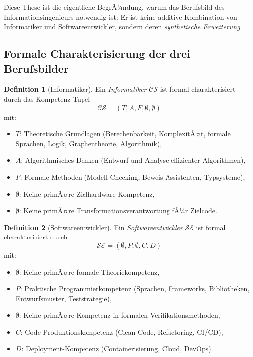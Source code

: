 ﻿\documentclass[a4paper,12pt]{article}
\theoremstyle{definition}
\newtheorem{definition}{Definition}
\begin{document}
Diese These ist die eigentliche BegrÃ¼ndung, warum das Berufsbild des
Informationsingenieurs notwendig ist: Er ist keine additive Kombination von
Informatiker und Softwareentwickler, sondern deren \emph{synthetische Erweiterung}.

\subsection{Formale Charakterisierung der drei Berufsbilder}

\begin{definition}[Informatiker]
\label{def:informatiker}
Ein \emph{Informatiker} $\mathcal{CS}$ ist formal charakterisiert durch das Kompetenz-Tupel
\[
  \mathcal{CS} = (T, A, F, \emptyset, \emptyset)
\]
mit:
\begin{itemize}
  \item $T$: Theoretische Grundlagen (Berechenbarkeit, KomplexitÃ¤t, formale Sprachen,
        Logik, Graphentheorie, Algorithmik),
  \item $A$: Algorithmisches Denken (Entwurf und Analyse effizienter Algorithmen),
  \item $F$: Formale Methoden (Modell-Checking, Beweis-Assistenten, Typsysteme),
  \item $\emptyset$: Keine primÃ¤re Zielhardware-Kompetenz,
  \item $\emptyset$: Keine primÃ¤re Transformationsverantwortung fÃ¼r Zielcode.
\end{itemize}
\end{definition}

\begin{definition}[Softwareentwickler]
\label{def:swentw}
Ein \emph{Softwareentwickler} $\mathcal{SE}$ ist formal charakterisiert durch
\[
  \mathcal{SE} = (\emptyset, P, \emptyset, C, D)
\]
mit:
\begin{itemize}
  \item $\emptyset$: Keine primÃ¤re formale Theoriekompetenz,
  \item $P$: Praktische Programmierkompetenz (Sprachen, Frameworks, Bibliotheken,
        Entwurfsmuster, Teststrategie),
  \item $\emptyset$: Keine primÃ¤re Kompetenz in formalen Verifikationsmethoden,
  \item $C$: Code-Produktionskompetenz (Clean Code, Refactoring, CI/CD),
  \item $D$: Deployment-Kompetenz (Containerisierung, Cloud, DevOps).
\end{itemize}
\end{definition}
\end{document}
